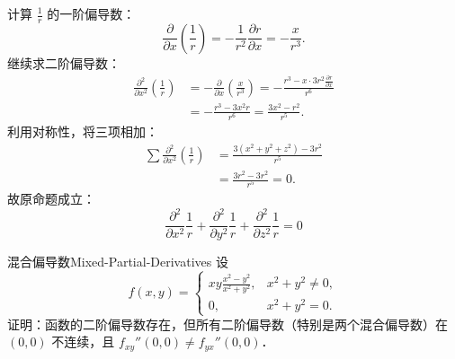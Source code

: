 \begin{myproof}
    计算 $\frac{1}{r}$ 的一阶偏导数：
    \begin{equation}
        \frac{\partial}{\partial x} \left( \frac{1}{r} \right) = -\frac{1}{r^2} \frac{\partial r}{\partial x} = -\frac{x}{r^3}.
    \end{equation}
    继续求二阶偏导数：
    \begin{equation}
        \begin{aligned}
            \frac{\partial^2}{\partial x^2} \left( \frac{1}{r} \right) & = -\frac{\partial}{\partial x} \left( \frac{x}{r^3} \right) = -\frac{r^3 - x \cdot 3r^2 \frac{\partial r}{\partial x}}{r^6} \\
                                                                       & = -\frac{r^3 - 3x^2 r}{r^6} = \frac{3x^2 - r^2}{r^5}.
        \end{aligned}
    \end{equation}
    利用对称性，将三项相加：
    \begin{equation}
        \begin{aligned}
            \sum \frac{\partial^2}{\partial x^2} \left( \frac{1}{r} \right) & = \frac{3(x^2 + y^2 + z^2) - 3r^2}{r^5} \\
                                                                            & = \frac{3r^2 - 3r^2}{r^5} = 0.
        \end{aligned}
    \end{equation}
    故原命题成立：
    \begin{equation}
        \boxed{\frac{\partial^2}{\partial x^2} \frac{1}{r} + \frac{\partial^2}{\partial y^2} \frac{1}{r} + \frac{\partial^2}{\partial z^2} \frac{1}{r} = 0}
    \end{equation}
\end{myproof}


\begin{problem}{混合偏导数}{Mixed-Partial-Derivatives}
    设
    \begin{equation}
        f(x, y) = \begin{cases} xy \frac{x^2 - y^2}{x^2 + y^2}, & x^2 + y^2 \neq 0, \\ 0, & x^2 + y^2 = 0. \end{cases}
    \end{equation}
    证明：函数的二阶偏导数存在，但所有二阶偏导数（特别是两个混合偏导数）在 $(0, 0)$ 不连续，且 $f_{xy}''(0, 0) \neq f_{yx}''(0, 0)$．
\end{problem}


